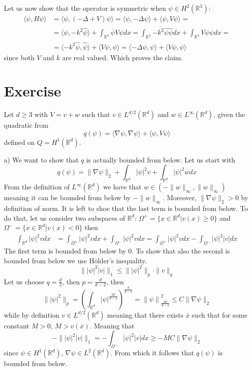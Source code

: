 \documentclass{article}
\newcommand{\R}{\mathbb{R}}
\begin{document}
Let us now show that the operator is symmetric when $\psi \in H^2(\R^3)$:
\[
    \begin{split}
        \langle \psi, H \psi \rangle &=  \langle \psi, (-\Delta + V) \psi \rangle = \langle \psi, - \Delta \psi \rangle + \langle \psi, V \psi \rangle = \\
        &= \langle \hat \psi,  -k^2 \hat\psi \rangle + \int_{\R^3} \overline{\psi} V \psi dx = \int_{\R^3} \overline{-k^2 \hat \psi} \hat \psi dx + \int_{\R^3} \overline{V \psi} \psi dx =\\
        &= \langle -k^2 \hat \psi, \hat \psi \rangle + \langle V \psi,  \psi \rangle = \langle -\Delta \psi, \psi \rangle + \langle V \psi, \psi \rangle
    \end{split}
\]
since both $V$ and $k$ are real valued. Which proves the claim.

\section{Exercise}
Let $d\geq 3$ with $V = v + w$ such that $v \in L^{d / 2} (\R^d)$ and $w \in L^\infty(\R^d)$, given the quadratic from
\[
    q(\psi) = \langle \nabla \psi, \nabla \psi \rangle + \langle \psi, V \psi \rangle
\]
defined on $Q= H^1 (\R^d)$.

a) We want to show that $q$ is actually bounded from below. Let us start with
\[
    q(\psi) = \| \nabla \psi \|_2 + \int_{\R^d} |\psi|^2 v + \int_{\R^d} |\psi|^2 w dx
\]
From the definition of $L^\infty (\R^d)$ we have that $w \in (-\| w \|_\infty, \| w\|_\infty)$ meaning it can be bounded from below by $-\| w \|_\infty$. Moreover, $\| \nabla \psi \|_2>0$ by definition of norm. It is left to shoe that the last term is bounded from below. 
To do that, let us consider two subspaces of $\R^d$: $\Omega^+ = \{ x \in \R^d | v(x)\geq 0 \}$ and $\Omega^- = \{ x \in \R^d | v(x)<0 \}$ then 
\[
    \begin{split}
        \int_{\R^d} |\psi|^2 v dx &= \int_{\Omega^+} |\psi|^2 v dx + \int_{\Omega^-} |\psi|^2 v dx = \int_{\Omega^+} |\psi|^2 v dx - \int_{\Omega^-} |\psi|^2 |v| dx
    \end{split}
\]
The first term is bounded from below by $0$. To show that also the second is bounded from below we use Hölder's inequality.
\[
    \| |\psi|^2 |v| \|_1  \leq \| |\psi|^2 \|_p \cdot \| v \|_q
\]
Let us choose $q = \frac{d}{2}$, then $p = \frac{d}{d-2}$, then
\[
    \| |\psi|^2 \|_p = {\left(\int_{\R^d} |\psi|^{\frac{2d}{d-2}}\right)}^{\frac{d}{d-2}} = {\| \psi \|}^2_{\frac{2d}{d-2}}  \leq C \| \nabla \psi  \|_2
\]
while by definition $v \in L^{d / 2}(\R^d)$ meaning that there exists $\bar x$ such that for some constant $M >0$, $M > v(\bar x)$. Meaning that
\[
    - \| |\psi|^2 |v| \|_1 =  - \int_{\Omega^-} |\psi|^2 |v| dx \geq - M C \| \nabla \psi  \|_2
\]
since $\psi \in H^1(\R^d)$, $\nabla \psi \in L^2(\R^d)$. From which it follows that $q(\psi)$ is bounded from below.
\end{document}
